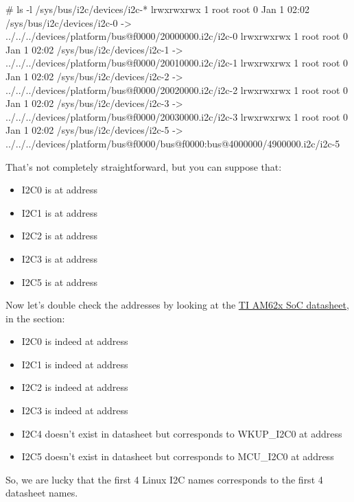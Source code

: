 \begin{bashinput}
# ls -l /sys/bus/i2c/devices/i2c-*
lrwxrwxrwx    1 root     root             0 Jan  1 02:02 /sys/bus/i2c/devices/i2c-0 -> ../../../devices/platform/bus@f0000/20000000.i2c/i2c-0
lrwxrwxrwx    1 root     root             0 Jan  1 02:02 /sys/bus/i2c/devices/i2c-1 -> ../../../devices/platform/bus@f0000/20010000.i2c/i2c-1
lrwxrwxrwx    1 root     root             0 Jan  1 02:02 /sys/bus/i2c/devices/i2c-2 -> ../../../devices/platform/bus@f0000/20020000.i2c/i2c-2
lrwxrwxrwx    1 root     root             0 Jan  1 02:02 /sys/bus/i2c/devices/i2c-3 -> ../../../devices/platform/bus@f0000/20030000.i2c/i2c-3
lrwxrwxrwx    1 root     root             0 Jan  1 02:02 /sys/bus/i2c/devices/i2c-5 -> ../../../devices/platform/bus@f0000/bus@f0000:bus@4000000/4900000.i2c/i2c-5
\end{bashinput}

That's not completely straightforward, but you can suppose that:
\begin{itemize}
\item I2C0 is at address 
\item I2C1 is at address 
\item I2C2 is at address 
\item I2C3 is at address 
\item I2C5 is at address 
\end{itemize}

Now let's double check the addresses by looking at the
\href{https://www.ti.com/lit/ug/spruiv7a/spruiv7a.pdf}{TI AM62x SoC
datasheet}, in the  section:

\begin{itemize}
\item I2C0 is indeed at address 
\item I2C1 is indeed at address 
\item I2C2 is indeed at address 
\item I2C3 is indeed at address 
\item I2C4 doesn't exist in datasheet but corresponds to
      WKUP\_I2C0 at address 
\item I2C5 doesn't exist in datasheet but corresponds to
      MCU\_I2C0 at address 
\end{itemize}

So, we are lucky that the first 4 Linux I2C names corresponds to the first 4
datasheet names.

